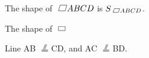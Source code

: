 \documentclass[UTF8]{article}
\newcommand\paralleleq{
	\mathrel{\text{
			\tikz[baseline,line width=0.1ex,line cap=round]
			\draw (0,0) -- (.7em,0)
			(0,.3ex) -- (.7em,.3ex)
			(.2em,.55ex) -- (.4em,1.8ex)
			(.35em,.55ex) -- (.55em,1.8ex);}}}
\newcommand\rectangle{
	\mathrel{\text{
			\tikz[baseline]
			\draw (0,.1ex) -- (.8em,.1ex) -- (.8em,1.3ex) -- (0em,1.3ex) -- cycle;}}}
\newcommand\parallelogram{
	\mathord{\text{
			\tikz[baseline]
			\draw (0,.1ex) -- (.8em,.1ex) -- (1em,1.6ex) -- (.2em,1.6ex) -- cycle;}}}
\let\pxsbx\parallelogram
\let\pxqdy\paralleleq
\begin{document}
The shape of $ \parallelogram ABCD$ is $ S_{\pxsbx ABCD} $.

The shape of $ \rectangle $

Line AB $\pxqdy$ CD, and AC $\paralleleq$ BD.
\end{document}
